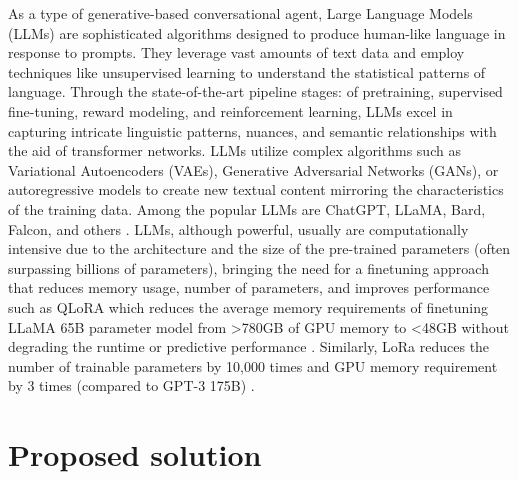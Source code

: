 \documentclass[runningheads]{llncs}
\begin{document}
As a type of generative-based conversational agent, Large Language Models (LLMs) are sophisticated algorithms designed to produce human-like language in response to prompts. They leverage vast amounts of text data and employ techniques like unsupervised learning to understand the statistical patterns of language. Through the state-of-the-art pipeline stages: of pretraining, supervised fine-tuning, reward modeling, and reinforcement learning, LLMs excel in capturing intricate linguistic patterns, nuances, and semantic relationships with the aid of transformer networks. LLMs utilize complex algorithms such as Variational Autoencoders (VAEs), Generative Adversarial Networks (GANs), or autoregressive models to create new textual content mirroring the characteristics of the training data. Among the popular LLMs are ChatGPT, LLaMA, Bard, Falcon, and others \cite{Hai_LLM_2023}. LLMs, although powerful, usually are computationally intensive due to the architecture and the size of the pre-trained parameters (often surpassing billions of parameters), bringing the need for a finetuning approach that reduces memory usage, number of parameters, and improves performance such as QLoRA which reduces the average memory requirements of finetuning  LLaMA 65B parameter model from >780GB of GPU memory to <48GB without degrading the runtime or predictive performance \cite{dettmers_qlora_2023}. Similarly, LoRa reduces the number of trainable parameters by 10,000 times and GPU memory requirement by 3 times (compared to GPT-3 175B) \cite{hu_lora_2021}.

\section{Proposed solution}
\label{sec:solution}
\end{document}
